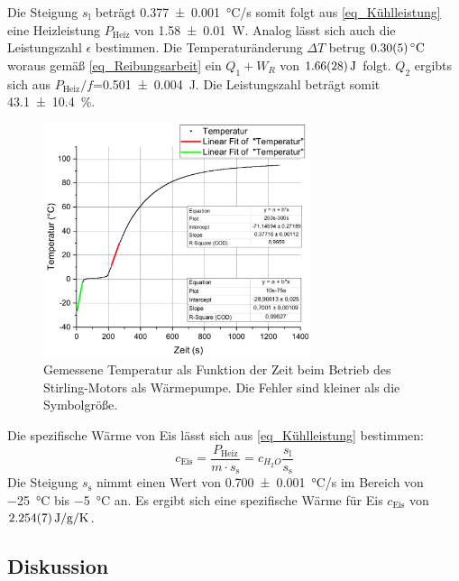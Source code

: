 \documentclass[
	a4paper,
	12pt,
	pagesize,
	ngerman
]{scrartcl}
\begin{document}
	Die Steigung $s_\text{l}$ beträgt \SI{0,377+-0,001}{\degreeCelsius/s} somit folgt aus \cref{eq_Kühlleistung} eine Heizleistung $P_\text{Heiz}$ von \SI{1,58+-0,01}{W}.
	Analog lässt sich auch die Leistungszahl $\epsilon$ bestimmen. 
	Die Temperaturänderung $\Delta{T}$ betrug $\SI{0,3+-0,05}{\degreeCelsius}$ woraus gemäß \cref{eq_Reibungsarbeit} ein $Q_1+W_R$ von $\SI{1,66+-0,28}{J}$ folgt. 
	$Q_2$ ergibts sich aus $P_\text{Heiz}/f$=\SI{0,501+-0,004}{J}. %
	Die Leistungszahl beträgt somit \SI{43,1+-10,4}{\%}.
	\begin{figure}[H]
		\includegraphics[width=0.7\textwidth]{Waerm}
		\centering
		\caption{Gemessene Temperatur als Funktion der Zeit beim Betrieb des Stirling-Motors als Wärmepumpe. Die Fehler sind kleiner als die Symbolgröße.}
		\label{fig_Waerm}
		\centering
	\end{figure}
	Die spezifische Wärme von Eis lässt sich aus \cref{eq_Kühlleistung} bestimmen:
	\begin{equation}
		c_\text{Eis} = \frac{P_\text{Heiz}}{m \cdot s_\text{s}} = c_{H_2O} \frac{s_\text{l}}{s_\text{s}}
	\end{equation} 
	Die Steigung $s_\text{s}$ nimmt einen Wert von \SI{0,700+-0,001}{\degreeCelsius/s} im Bereich von \SI{-25}{\degreeCelsius} bis \SI{-5}{\degreeCelsius} an. 
	Es ergibt sich eine spezifische Wärme für Eis $c_\text{Eis}$ von $\SI{2,254+-0,007}{J/g/K}$.
	\subsection{Diskussion}
	
	
\end{document}
